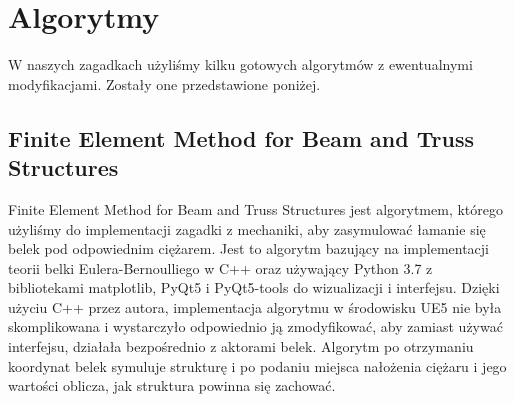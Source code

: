 \section{Algorytmy}
W naszych zagadkach użyliśmy kilku gotowych algorytmów z ewentualnymi modyfikacjami. Zostały one przedstawione poniżej.

\subsection{Finite Element Method for Beam and Truss Structures}

Finite Element Method for Beam and Truss Structures jest algorytmem, którego użyliśmy do implementacji zagadki z mechaniki, aby zasymulować łamanie się belek pod odpowiednim ciężarem. Jest to algorytm bazujący na implementacji teorii belki Eulera-Bernoulliego w C++ oraz używający Python 3.7 z bibliotekami matplotlib, PyQt5 i PyQt5-tools do wizualizacji i interfejsu. \cite{FEMBTS_git} Dzięki użyciu C++ przez autora, implementacja algorytmu w środowisku UE5 nie była skomplikowana i wystarczyło odpowiednio ją zmodyfikować, aby zamiast używać interfejsu, działała bezpośrednio z aktorami belek. Algorytm po otrzymaniu koordynat belek symuluje strukturę i po podaniu miejsca nałożenia ciężaru i jego wartości oblicza, jak struktura powinna się zachować.
